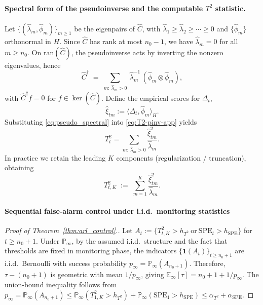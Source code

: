 \documentclass{article}
\theoremstyle{plain}
\theoremstyle{definition}
\theoremstyle{remark}
\begin{document}
\paragraph{Spectral form of the pseudoinverse and the computable $T^2$ statistic.}
Let $\{(\widehat\lambda_m,\widehat\phi_m)\}_{m\ge1}$ be the eigenpairs of $\widehat C$, with
$\widehat\lambda_1\ge\widehat\lambda_2\ge\cdots\ge0$ and $\{\widehat\phi_m\}$ orthonormal in $H$.
Since $\widehat C$ has rank at most $n_0-1$, we have $\widehat\lambda_m=0$ for all $m\ge n_0$.
On $\mathrm{ran}(\widehat C)$, the pseudoinverse acts by inverting the nonzero eigenvalues, hence
\begin{equation}
\label{eq:pseudo_spectral}
\widehat C^{\dagger}
\;=\;
\sum_{m:\ \widehat\lambda_m>0}\ \widehat\lambda_m^{-1}\,(\widehat\phi_m\otimes \widehat\phi_m),
\end{equation}
with $\widehat C^{\dagger}f=0$ for $f\in\ker(\widehat C)$.
Define the empirical scores for $\Delta_t$,
\[
\widehat\xi_{tm}:=\langle \Delta_t,\widehat\phi_m\rangle_H.
\]
Substituting \cref{eq:pseudo_spectral} into \cref{eq:T2-pinv-app} yields
\[
T_t^2
=
\sum_{m:\ \widehat\lambda_m>0}\frac{\widehat\xi_{tm}^2}{\widehat\lambda_m}.
\]
In practice we retain the leading $K$ components (regularization / truncation), obtaining
\begin{equation}
\label{eq:T2-mf-app}
T_{t,K}^2
\;:=\;
\sum_{m=1}^{K}\frac{\widehat\xi_{tm}^2}{\widehat\lambda_m}.
\end{equation}

\paragraph{Sequential false-alarm control under i.i.d.\ monitoring statistics}
\label{app:arl}
\begin{proof}[Proof of Theorem~\ref{thm:arl_control}.]
Let $A_t:=\{T_{t,K}^2>h_{T^2}\ \text{or}\ \mathrm{SPE}_t>h_{\mathrm{SPE}}\}$ for $t\ge n_0+1$.
Under $\mathbb P_\infty$, by the assumed i.i.d.\ structure and the fact that thresholds are fixed in monitoring phase, the indicators $\{\mathbf 1(A_t)\}_{t\ge n_0+1}$ are i.i.d.\ Bernoulli with success probability $p_\infty=\mathbb P_\infty(A_{n_0+1})$.
Therefore, $\tau-(n_0+1)$ is geometric with mean $1/p_\infty$, giving $\mathbb E_\infty[\tau]=n_0+1+1/p_\infty$.
The union-bound inequality follows from
$p_\infty=\mathbb P_\infty(A_{n_0+1})\le \mathbb P_\infty(T_{1,K}^2>h_{T^2})+\mathbb P_\infty(\mathrm{SPE}_1>h_{\mathrm{SPE}})\le \alpha_{T^2}+\alpha_{\mathrm{SPE}}$.
\end{proof}
\end{document}
